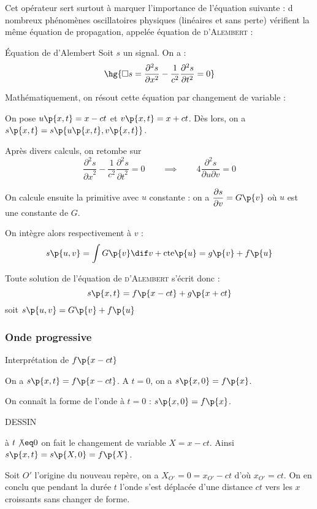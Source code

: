     Cet opérateur sert surtout à marquer l'importance de l'équation suivante : d nombreux phénomènes oscillatoires physiques (linéaires et sans perte) vérifient la même équation de propagation, appelée équation de \textsc{d'Alembert} :
    \begin{definition}{Équation de d'Alembert}{}
        Soit $s$ un signal. On a :
        \[ \hg{\Box s = \dfrac{\partial^2s}{\partial x^2} - \dfrac{1}{c^2}\dfrac{\partial^2s}{\partial t^2} = 0}\]
    \end{definition}
    Mathématiquement, on résout cette équation par changement de variable :
    \begin{enumerate}
        \itt On pose $u\p{x, t} = x - ct$ et $v\p{x, t} = x + ct$. Dès lors, on a
        $s\p{x, t} = s\p{u\p{x, t}, v\p{x, t}}$. 
        
        Après divers calculs, on retombe sur
        \[ \frac{\partial^2 s}{{\partial x}^2} - \frac{1}{c^2}\frac{\partial^2 s}{{\partial t}^2} = 0 \qquad\implies\qquad 4\frac{\partial^2 s}{\partial u \partial v} = 0 \]
        
        \itt On calcule ensuite la primitive avec $u$ constante : on a $\dfrac{\partial s}{\partial v} = G\p{v}$ où $u$ est une constante de $G$.
    
        On intègre alors respectivement à $v$ :
        \[ s\p{u, v} = \int G \p{v} \dif v + \text{cte}\p{u} = g\p{v} + f\p{u}\]
        
        \itt Toute solution de l'équation de \textsc{d'Alembert} s'écrit donc :
        \[ s\p{x, t} = f\p{x - ct} + g\p{x + ct}\]
       soit $s\p{u, v} = G\p{v} + f\p{u}$
    \end{enumerate}

    \subsubsection{Onde progressive}

    Interprétation de $f\p{x - ct}$
    
    \begin{nproof}
        On a $s\p{x, t} = f\p{x - ct}$. A $t = 0$, on a $s\p{x, 0} = f\p{x}$.
        
        On connaît la forme de l'onde à $t = 0$ : \qquad $s\p{x, 0} = f\p{x}$.
        
        DESSIN

        à $t \not\eq 0$ on fait le changement de variable $X = x - ct$. Ainsi $s\p{x, t} = s\p{X, 0} = f\p{X}$.
        
        Soit $O'$ l'origine du nouveau repère, on a $X_{O'} = 0 = x_{O'} - ct$ d'où $x_{O'} = ct$. On en conclu que pendant la durée $t$ l'onde s'est déplacée d'une distance $ct$ vers les $x$ croissants sans changer de forme.
    \end{nproof}

